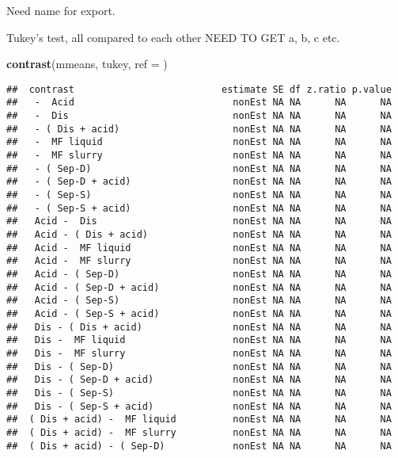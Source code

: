 \documentclass[
]{article}
\newenvironment{Shaded}{\begin{snugshade}}{\end{snugshade}}
\newcommand{\AttributeTok}[1]{\textcolor[rgb]{0.13,0.29,0.53}{#1}}
\newcommand{\FunctionTok}[1]{\textcolor[rgb]{0.13,0.29,0.53}{\textbf{#1}}}
\newcommand{\NormalTok}[1]{#1}
\newcommand{\StringTok}[1]{\textcolor[rgb]{0.31,0.60,0.02}{#1}}
\begin{document}
Need name for export.

Tukey's test, all compared to each other NEED TO GET a, b, c etc.

\begin{Shaded}
\begin{Highlighting}[]
\FunctionTok{contrast}\NormalTok{(mmeans, }\StringTok{\textquotesingle{}tukey\textquotesingle{}}\NormalTok{, }\AttributeTok{ref =} \StringTok{\textquotesingle{}\textquotesingle{}}\NormalTok{)}
\end{Highlighting}
\end{Shaded}

\begin{verbatim}
##  contrast                          estimate SE df z.ratio p.value
##   -  Acid                            nonEst NA NA      NA      NA
##   -  Dis                             nonEst NA NA      NA      NA
##   - ( Dis + acid)                    nonEst NA NA      NA      NA
##   -  MF liquid                       nonEst NA NA      NA      NA
##   -  MF slurry                       nonEst NA NA      NA      NA
##   - ( Sep-D)                         nonEst NA NA      NA      NA
##   - ( Sep-D + acid)                  nonEst NA NA      NA      NA
##   - ( Sep-S)                         nonEst NA NA      NA      NA
##   - ( Sep-S + acid)                  nonEst NA NA      NA      NA
##   Acid -  Dis                        nonEst NA NA      NA      NA
##   Acid - ( Dis + acid)               nonEst NA NA      NA      NA
##   Acid -  MF liquid                  nonEst NA NA      NA      NA
##   Acid -  MF slurry                  nonEst NA NA      NA      NA
##   Acid - ( Sep-D)                    nonEst NA NA      NA      NA
##   Acid - ( Sep-D + acid)             nonEst NA NA      NA      NA
##   Acid - ( Sep-S)                    nonEst NA NA      NA      NA
##   Acid - ( Sep-S + acid)             nonEst NA NA      NA      NA
##   Dis - ( Dis + acid)                nonEst NA NA      NA      NA
##   Dis -  MF liquid                   nonEst NA NA      NA      NA
##   Dis -  MF slurry                   nonEst NA NA      NA      NA
##   Dis - ( Sep-D)                     nonEst NA NA      NA      NA
##   Dis - ( Sep-D + acid)              nonEst NA NA      NA      NA
##   Dis - ( Sep-S)                     nonEst NA NA      NA      NA
##   Dis - ( Sep-S + acid)              nonEst NA NA      NA      NA
##  ( Dis + acid) -  MF liquid          nonEst NA NA      NA      NA
##  ( Dis + acid) -  MF slurry          nonEst NA NA      NA      NA
##  ( Dis + acid) - ( Sep-D)            nonEst NA NA      NA      NA

\end{verbatim}
\end{document}
